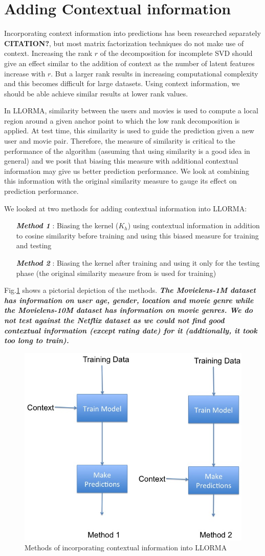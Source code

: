 \documentclass[10 pt,table]{article}  %
\newcommand{\figref}[1]{Fig.\ref{#1}}
\begin{document}
\section{Adding Contextual information}
Incorporating context information into predictions has been researched separately \textbf{CITATION?}, but most matrix factorization techniques do not make use of context. Increasing the rank $r$ of the decomposition for incomplete SVD should give an effect similar to the addition of context as the number of latent features increase with $r$. But a larger rank results in increasing computational complexity and this becomes difficult for large datasets. Using context information, we should be able achieve similar results at lower rank values.

In LLORMA, similarity between the users and movies is used to compute a local region around a given anchor point to which the low rank decomposition is applied. At test time, this similarity is used to guide the prediction given a new user and movie pair. Therefore, the measure of similarity is critical to the performance of the algorithm (assuming that using similarity is a good idea in general) and we posit that biasing this measure with additional contextual information may give us better prediction performance. We look at combining this information with the original similarity measure to gauge its effect on prediction performance. 

We looked at two methods for adding contextual information into LLORMA:
\begin{itemize}
\item[\textbf{\emph{Method 1}}]: Biasing the kernel ($K_h$) using contextual information in addition to cosine similarity before training and using this biased measure for training and testing
\item[\textbf{\emph{Method 2}}]: Biasing the kernel after training and using it only for the testing phase (the original similarity measure from \cite{lee2013local} is used for training)
\end{itemize}
\figref{fig:simMethods} shows a pictorial depiction of the methods.  \emph{\textbf{ The Movielens-1M dataset has information on user age, gender, location and movie genre while the Movielens-10M dataset has information on movie genres. We do not test against the Netflix dataset as we could not find good contextual information (except rating date) for it (addtionally, it took too long to train).}}

\begin{figure}[h!]
\centering
\includegraphics[width=0.4\columnwidth]{simMethods}
\caption{\small Methods of incorporating contextual information into LLORMA}
\label{fig:simMethods} \vspace{-1mm}
\end{figure} 
\end{document}
